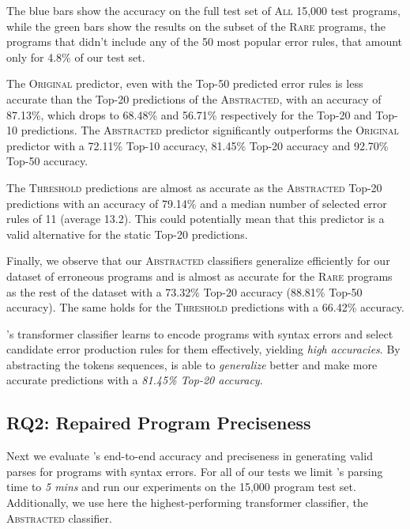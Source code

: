 The blue bars show the accuracy on the full test set of \textsc{All} 15,000 test
programs, while the green bars show the results on the subset of the
\textsc{Rare} programs, \ie the programs that didn't include any of the 50 most
popular error rules, that amount only for 4.8\% of our test set.

The \textsc{Original} predictor, even with the Top-50 predicted error rules is
less accurate than the Top-20 predictions of the \textsc{Abstracted}, with an
accuracy of 87.13\%, which drops to 68.48\% and 56.71\% respectively for the
Top-20 and Top-10 predictions. The \textsc{Abstracted} predictor significantly
outperforms the \textsc{Original} predictor with a 72.11\% Top-10 accuracy,
81.45\% Top-20 accuracy and 92.70\% Top-50 accuracy.

The \textsc{Threshold} predictions are almost as accurate as the
\textsc{Abstracted} Top-20 predictions with an accuracy of 79.14\% and a median
number of selected error rules of 11 (average 13.2). This could potentially mean
that this predictor is a valid alternative for the static Top-20 predictions.

Finally, we observe that our \textsc{Abstracted} classifiers generalize
efficiently for our dataset of erroneous \python programs and is almost as
accurate for the \textsc{Rare} programs as the rest of the dataset with a
73.32\% Top-20 accuracy (88.81\% Top-50 accuracy). The same holds for the
\textsc{Threshold} predictions with a 66.42\% accuracy.

\begin{framed}
  \noindent \toolname's transformer classifier learns to encode programs with
  syntax errors and select candidate error production rules for them
  effectively, yielding \emph{high accuracies}. By abstracting the tokens
  sequences, \toolname is able to \emph{generalize} better and make more
  accurate predictions with a \emph{81.45\% Top-20 accuracy}.
\end{framed}


\subsection{RQ2: Repaired Program Preciseness}
\label{sec:eval:precise}

Next we evaluate \toolname's end-to-end accuracy and preciseness in generating
valid parses for programs with syntax errors. For all of our tests we limit
\toolname's parsing time to \emph{5 mins} and run our experiments on the 15,000
program  test set. Additionally, we use here the highest-performing transformer
classifier, the \textsc{Abstracted} classifier.

